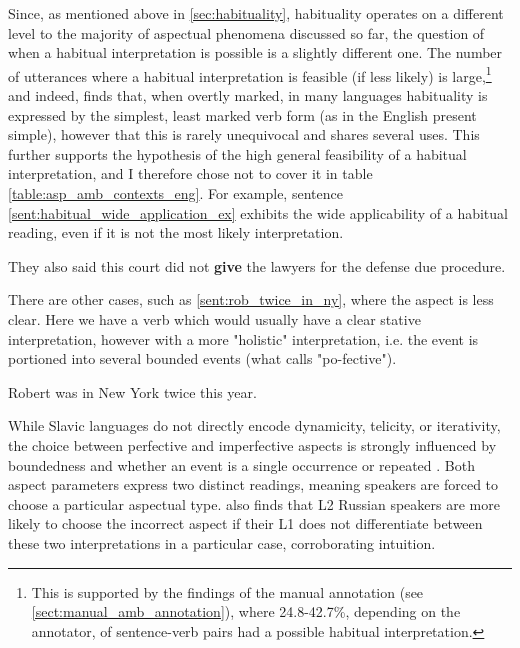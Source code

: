 Since, as mentioned above in \ref{sec:habituality}, habituality operates on a different level to the majority of aspectual phenomena discussed so far, the question of when a habitual interpretation is possible is a slightly different one. The number of utterances where a habitual interpretation is feasible (if less likely) is large,\footnote{This is supported by the findings of the manual annotation (see \ref{sect:manual_amb_annotation}), where 24.8-42.7\%, depending on the annotator, of sentence-verb pairs had a possible habitual interpretation.} and indeed, \citep{Dahl1985TenseAA} finds that, when overtly marked, in many languages habituality is expressed by the simplest, least marked verb form (as in the English present simple), however that this is rarely unequivocal and shares several uses. This further supports the hypothesis of the high general feasibility of a habitual interpretation, and I therefore chose not to cover it in table \ref{table:asp_amb_contexts_eng}. For example, sentence \ref{sent:habitual_wide_application_ex} exhibits the wide applicability of a habitual reading, even if it is not the most likely interpretation.

\begin{exe}
    \ex They also said this court did not \textbf{give} the lawyers for the defense due procedure.
    \label{sent:habitual_wide_application_ex}
\end{exe}

There are other cases, such as \ref{sent:rob_twice_in_ny}, where the aspect is less clear. Here we have a verb which would usually have a clear stative interpretation, however with a more "holistic" interpretation, i.e. the event is portioned into several bounded events (what \citet{10.1093/jos/8.4.363} calls "po-fective").

\begin{exe}
    \ex Robert was in New York twice this year.
    \label{sent:rob_twice_in_ny}
\end{exe}

While Slavic languages do not directly encode dynamicity, telicity, or iterativity, the choice between perfective and imperfective aspects is strongly influenced by boundedness and whether an event is a single occurrence or repeated \citep{wiemer2017}. Both aspect parameters express two distinct readings, meaning speakers are forced to choose a particular aspectual type. \citet{errors_in_russian_aspect_apresyan} also finds that L2 Russian speakers are more likely to choose the incorrect aspect if their L1 does not differentiate between these two interpretations in a particular case, corroborating intuition.

